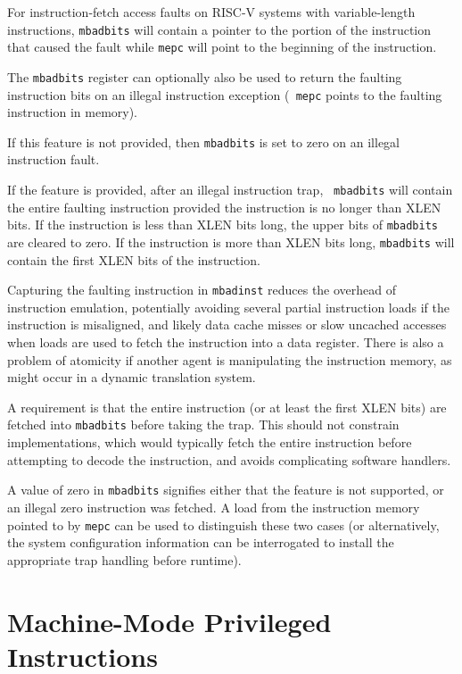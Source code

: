 For instruction-fetch access faults on RISC-V systems with
variable-length instructions, {\tt mbadbits} will contain a pointer to
the portion of the instruction that caused the fault while {\tt mepc}
will point to the beginning of the instruction.

The {\tt mbadbits} register can optionally also be used to return the
faulting instruction bits on an illegal instruction exception ({\tt
  mepc} points to the faulting instruction in memory).

If this feature is not provided, then {\tt mbadbits} is set to zero on
an illegal instruction fault.

If the feature is provided, after an illegal instruction trap, {\tt
  mbadbits} will contain the entire faulting instruction provided the
instruction is no longer than XLEN bits.  If the instruction is less
than XLEN bits long, the upper bits of {\tt mbadbits} are cleared to
zero. If the instruction is more than XLEN bits long, {\tt mbadbits}
will contain the first XLEN bits of the instruction.

\begin{commentary}
  Capturing the faulting instruction in {\tt mbadinst} reduces the
  overhead of instruction emulation, potentially avoiding several
  partial instruction loads if the instruction is misaligned, and
  likely data cache misses or slow uncached accesses when loads are
  used to fetch the instruction into a data register.  There is also a
  problem of atomicity if another agent is manipulating the
  instruction memory, as might occur in a dynamic translation system.

  A requirement is that the entire instruction (or at least the first
  XLEN bits) are fetched into {\tt mbadbits} before taking the trap.
  This should not constrain implementations, which would typically
  fetch the entire instruction before attempting to decode the
  instruction, and avoids complicating software handlers.

  A value of zero in {\tt mbadbits} signifies either that the feature is
  not supported, or an illegal zero instruction was fetched.  A load
  from the instruction memory pointed to by {\tt mepc} can be used to
  distinguish these two cases (or alternatively, the system
  configuration information can be interrogated to install the
  appropriate trap handling before runtime).
\end{commentary}

\section{Machine-Mode Privileged Instructions}

